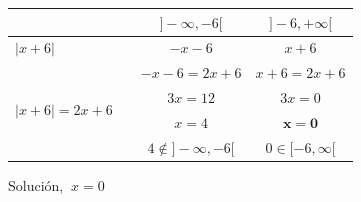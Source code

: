 \begin{miejercicio}
\begin{table}[H]
\centering
\begin{tabular}{l|c|c|}
\cline{2-3}
 & $]-\infty,-6[$ & $]-6,+\infty[$ \\ \hline
\multicolumn{1}{|l|}{$|x+6|$} & $-x-6$ & $x+6$ \\ \hline
\multicolumn{1}{|l|}{\multirow{4}{*}{$|x+6|=2x+6\quad$}} & $-x-6=2x+6$ & $x+6=2x+6$ \\
\multicolumn{1}{|l|}{} & $3x=12$ & $3x=0$ \\
\multicolumn{1}{|l|}{} & $x=4$ & $\boldsymbol{x=0}$ \\
\multicolumn{1}{|l|}{} & $4 \notin ]-\infty,-6[$ & $0\in [-6,\infty[$ \\ \hline
\end{tabular}
\end{table}

Solución, $\ x=0$	
\end{miejercicio}


